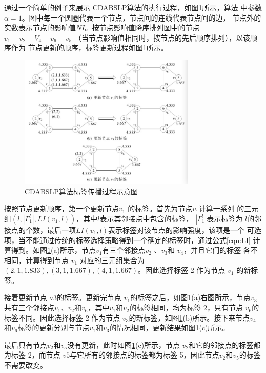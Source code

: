 通过一个简单的例子来展示 CDABSLP算法的执行过程，如图\ref{fig:fig3-4}所示，算法
中参数$\alpha =1$。图中每一个圆圈代表一个节点，节点间的连线代表节点间的边，
节点外的实数表示节点的影响值$ NI$。按节点影响值降序排列图中的节点$v_1-v_2-V_4-v_6-v_5$
（当节点影响值相同时，按节点的先后顺序排列），以该顺序作为
节点更新的顺序，标签更新过程如图\ref{fig:fig3-4}所示。

\begin{figure}
  \centering
  \includegraphics[width=0.75\textwidth]{figures/fig3-4}
  \caption{CDABSLP算法标签传播过程示意图}\label{fig:fig3-4}
 \end{figure}

 按照节点更新顺序，第一个更新节点$v_1$
的标签。首先为节点$v_1$计算一系列
的三元组$(l,|\Gamma _1^l|,LI(v_1,l))$，其中$ l $表示其邻接点中包含的标签，
$|\Gamma _1^l|$表示标签为
$l $的邻接点的个数，最后一项$LI(v_1,l)$表示标签对该节点的影响强度，该项是一个
可选项，当不能通过传统的标签选择策略得到一个确定的标签时，通过公式\ref{eqn:LI}
计算得到。如图\ref{fig:fig3-4}(a)所示，节点$ v_1
$有三个邻接点$ v_2$
、$v_3$和 $v_4$，并且它们的标签
各不相同，计算得到节点 $v_1$
对应的三元组集合为${(2, 1, 1.833), (3, 1, 1.667), (4, 1, 
1.667)}$。因此选择标签 2 作为节点 $v_1$
的新标签。 

接着更新节点 v3的标签。更新完节点 $v_1$的标签之后，如图\ref{fig:fig3-4}(a)右图所示，节点$ v_3$共有三个邻接点$ v_1$、$v_2$和$ v_6$，其中$ v_1$和$ v_2$的标签相同，均为标签 2，只有节点 $v_6$的标签不同。因此选择标签 2 作为节点 $v_3$的新标签，如图\ref{fig:fig3-4}(b)所示。接下来节点$ v_4$和$ v_6$标签的更新分别与节点$ v_1$和$ v_3$的情况相同，更新结果如图\ref{fig:fig3-4}(c)所示。

最后只有节点$ v_2$和$ v_5$没有更新，此时如图\ref{fig:fig3-4}(c)所示，节点 $v_2$和它的邻接点的标签都为标签 2，而节点 $v5$与它所有的邻接点的标签都为标签 5，因此节点$v_2$和$ v_5$的标签不需要改变。

